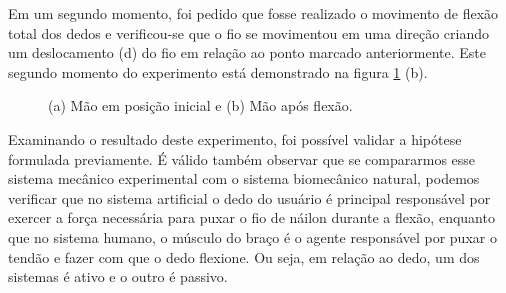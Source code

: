 \documentclass[
	12pt,				%
	openright,			%
	oneside,			%
	a4paper,			%
	english,			%
	brazil				%
	]{abntex2}
\begin{document}
			Em um segundo momento, foi pedido que fosse realizado o movimento de flexão total dos dedos e verificou-se que o fio se movimentou em uma direção criando um deslocamento (d) do fio em relação ao ponto marcado anteriormente. Este segundo momento do experimento está demonstrado na figura \ref{Fig:hand-wire-steady-and-flex} (b).
		

 

\begin{figure}[!htb]
   \centering
   \caption{ (a) Mão em posição inicial e (b) Mão após flexão.}
   \centering
   \label{Fig:hand-wire-steady-and-flex}
 \end{figure}

		Examinando o resultado deste experimento, foi possível validar a hipótese formulada previamente. É válido também observar que se compararmos esse sistema mecânico experimental com o sistema biomecânico natural, podemos verificar que no sistema artificial o dedo do usuário é principal responsável por exercer a força necessária para puxar o fio de náilon durante a flexão, enquanto que no sistema humano, o músculo do braço é o agente responsável por puxar o tendão e fazer com que o dedo flexione. Ou seja, em relação ao dedo, um dos sistemas é ativo e o outro é passivo.
\end{document}
